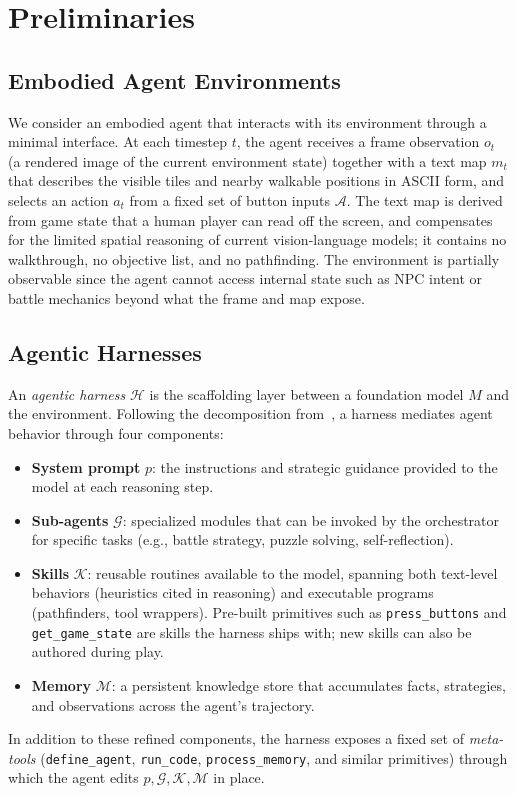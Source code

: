 \section{Preliminaries}\label{sec:preliminaries}

\subsection{Embodied Agent Environments}

We consider an embodied agent that interacts with its environment through a minimal interface. At each timestep $t$, the agent receives a frame observation $o_t$ (a rendered image of the current environment state) together with a text map $m_t$ that describes the visible tiles and nearby walkable positions in ASCII form, and selects an action $a_t$ from a fixed set of button inputs $\mathcal{A}$. The text map is derived from game state that a human player can read off the screen, and compensates for the limited spatial reasoning of current vision-language models; it contains no walkthrough, no objective list, and no pathfinding. The environment is partially observable since the agent cannot access internal state such as NPC intent or battle mechanics beyond what the frame and map expose.

\subsection{Agentic Harnesses}

An \emph{agentic harness} $\mathcal{H}$ is the scaffolding layer between a foundation model $M$ and the environment. Following the decomposition from~\citet{karten2026pokeagent}, a harness mediates agent behavior through four components:
\begin{itemize}
    \item \textbf{System prompt} $p$: the instructions and strategic guidance provided to the model at each reasoning step.
    \item \textbf{Sub-agents} $\mathcal{G}$: specialized modules that can be invoked by the orchestrator for specific tasks (e.g., battle strategy, puzzle solving, self-reflection).
    \item \textbf{Skills} $\mathcal{K}$: reusable routines available to the model, spanning both text-level behaviors (heuristics cited in reasoning) and executable programs (pathfinders, tool wrappers). Pre-built primitives such as \texttt{press\_buttons} and \texttt{get\_game\_state} are skills the harness ships with; new skills can also be authored during play.
    \item \textbf{Memory} $\mathcal{M}$: a persistent knowledge store that accumulates facts, strategies, and observations across the agent's trajectory.
\end{itemize}
In addition to these refined components, the harness exposes a fixed set of \emph{meta-tools} (\texttt{define\_agent}, \texttt{run\_code}, \texttt{process\_memory}, and similar primitives) through which the agent edits $p, \mathcal{G}, \mathcal{K}, \mathcal{M}$ in place.

